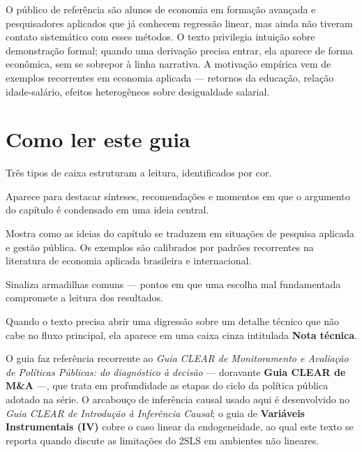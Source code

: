 \documentclass[12pt, a4paper, openany]{book}
\begin{document}
O público de referência são alunos de economia em formação avançada e
pesquisadores aplicados que já conhecem regressão linear, mas ainda não tiveram
contato sistemático com esses métodos. O texto privilegia intuição sobre
demonstração formal; quando uma derivação precisa entrar, ela aparece de
forma econômica, sem se sobrepor à linha narrativa. A motivação empírica vem
de exemplos recorrentes em economia aplicada --- retornos da educação,
relação idade-salário, efeitos heterogêneos sobre desigualdade salarial.

\newpage

\thispagestyle{empty}
\chapter*{Como ler este guia}

Três tipos de caixa estruturam a leitura, identificados por cor.

\begin{destacebox}
Aparece para destacar sínteses, recomendações e momentos em que o argumento
do capítulo é condensado em uma ideia central.
\end{destacebox}

\begin{exemplobox}
Mostra como as ideias do capítulo se traduzem em situações de pesquisa
aplicada e gestão pública. Os exemplos são calibrados por padrões recorrentes
na literatura de economia aplicada brasileira e internacional.
\end{exemplobox}

\begin{atencaobox}
Sinaliza armadilhas comuns --- pontos em que uma escolha mal fundamentada
compromete a leitura dos resultados.
\end{atencaobox}

Quando o texto precisa abrir uma digressão sobre um detalhe técnico que
não cabe no fluxo principal, ela aparece em uma caixa cinza intitulada
\textbf{Nota técnica}.

\medskip

\noindent O guia faz referência recorrente ao \textit{Guia CLEAR de
Monitoramento e Avaliação de Políticas Públicas: do diagnóstico à decisão}
--- doravante \textbf{Guia CLEAR de M\&A} ---, que trata em profundidade as
etapas do ciclo da política pública adotado na série. O arcabouço de
inferência causal usado aqui é desenvolvido no \textit{Guia CLEAR de
Introdução à Inferência Causal}; o guia de \textbf{Variáveis Instrumentais
(IV)} cobre o caso linear da endogeneidade, ao qual este texto se reporta
quando discute as limitações do 2SLS em ambientes não lineares.
\end{document}
